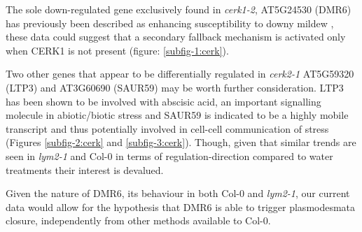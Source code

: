 \documentclass[../main.tex]{subfiles}
\begin{document}
The sole down-regulated gene exclusively found in \textit{cerk1-2}, AT5G24530
(DMR6) has previously been described as enhancing susceptibility to downy mildew
\cite{zeilmakerDOWNYMILDEWRESISTANT2015}, these data could suggest that a secondary fallback
mechanism is activated only when CERK1 is not present (figure:
\ref{subfig-1:cerk}).

Two other genes that appear to be differentially regulated in \textit{cerk2-1}
AT5G59320 (LTP3) and AT3G60690 (SAUR59) may be worth further consideration. LTP3
has been shown to be involved with abscisic acid, an important signalling
molecule in abiotic/biotic stress \cite{vishwakarmaAbscisicAcidSignaling2017} and
SAUR59 is indicated to be a highly mobile transcript
\cite{thiemeEndogenousArabidopsisMessenger2015} and thus potentially involved in
cell-cell communication of stress (Figures \ref{subfig-2:cerk} and
\ref{subfig-3:cerk}). Though, given that similar trends are seen in
\textit{lym2-1} and Col-0 in terms of regulation-direction compared to water
treatments their interest is devalued.

Given the nature of DMR6, its behaviour in both Col-0 and \textit{lym2-1}, our
current data would allow for the hypothesis that DMR6 is able to trigger
plasmodesmata closure, independently from other methods available to Col-0.

\end{document}
